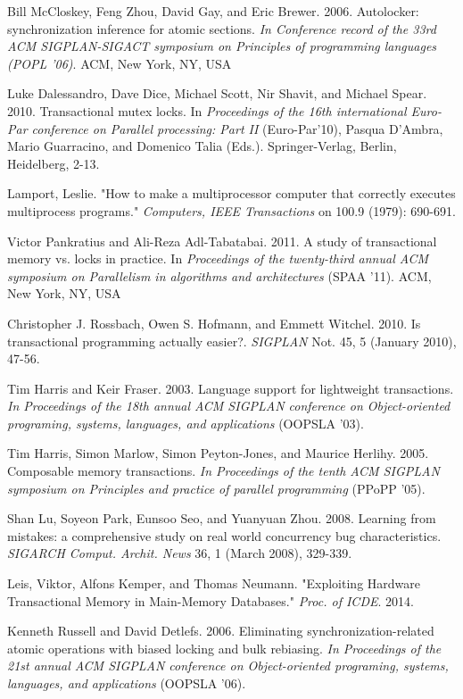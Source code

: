 \documentclass{sigplanconf}
\begin{document}
\begin{thebibliography}{}
  Bill McCloskey, Feng Zhou, David Gay, and Eric
  Brewer. 2006. Autolocker: synchronization inference for atomic
  sections. \emph{In Conference record of the 33rd ACM SIGPLAN-SIGACT
  symposium on Principles of programming languages (POPL '06)}. ACM,
  New York, NY, USA

  Luke Dalessandro, Dave Dice, Michael Scott, Nir Shavit, and Michael
  Spear. 2010. Transactional mutex locks. In \emph{Proceedings of the
    16th international Euro-Par conference on Parallel processing: Part
    II} (Euro-Par'10), Pasqua D'Ambra, Mario Guarracino, and Domenico
  Talia (Eds.). Springer-Verlag, Berlin, Heidelberg, 2-13.

  Lamport, Leslie. "How to make a multiprocessor computer that
  correctly executes multiprocess programs." \emph{Computers, IEEE
    Transactions} on 100.9 (1979): 690-691.

  Victor Pankratius and Ali-Reza Adl-Tabatabai. 2011. A study of
  transactional memory vs. locks in practice. In \emph{Proceedings of
    the twenty-third annual ACM symposium on Parallelism in algorithms
    and architectures} (SPAA '11). ACM, New York, NY, USA

  Christopher J. Rossbach, Owen S. Hofmann, and Emmett
  Witchel. 2010. Is transactional programming actually
  easier?. \emph{SIGPLAN} Not. 45, 5 (January 2010), 47-56.

  Tim Harris and Keir Fraser. 2003. Language support for lightweight
  transactions. \emph{In Proceedings of the 18th annual ACM SIGPLAN
    conference on Object-oriented programing, systems, languages, and
    applications} (OOPSLA '03).

  Tim Harris, Simon Marlow, Simon Peyton-Jones, and Maurice
  Herlihy. 2005. Composable memory transactions. \emph{In Proceedings
    of the tenth ACM SIGPLAN symposium on Principles and practice of
    parallel programming} (PPoPP '05).

  Shan Lu, Soyeon Park, Eunsoo Seo, and Yuanyuan Zhou. 2008. Learning
  from mistakes: a comprehensive study on real world concurrency bug
  characteristics. \emph{SIGARCH Comput. Archit. News} 36, 1 (March 2008),
  329-339.

  Leis, Viktor, Alfons Kemper, and Thomas Neumann. "Exploiting
  Hardware Transactional Memory in Main-Memory Databases."
  \emph{Proc. of ICDE}. 2014.

  Kenneth Russell and David Detlefs. 2006. Eliminating
  synchronization-related atomic operations with biased locking and
  bulk rebiasing. \emph{In Proceedings of the 21st annual ACM SIGPLAN
    conference on Object-oriented programing, systems, languages, and
    applications} (OOPSLA '06).

\end{thebibliography}
\end{document}
